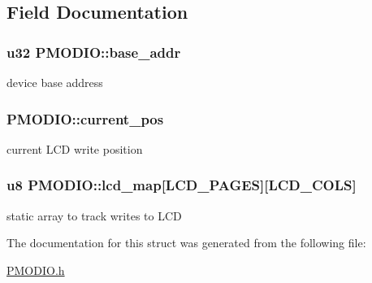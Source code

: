 \subsection{Field Documentation}
\hypertarget{structPMODIO_ad427392097b1a736b78a223b9ba0b646}{
\subsubsection[{base\-\_\-addr}]{\setlength{\rightskip}{0pt plus 5cm}u32 P\-M\-O\-D\-I\-O\-::base\-\_\-addr}}\label{structPMODIO_ad427392097b1a736b78a223b9ba0b646}
device base address \hypertarget{structPMODIO_ab0badb5cd0896ea00f8c2d2c2f51a481}{
\subsubsection[{current\-\_\-pos}]{ P\-M\-O\-D\-I\-O\-::current\-\_\-pos}}\label{structPMODIO_ab0badb5cd0896ea00f8c2d2c2f51a481}
current L\-C\-D write position \hypertarget{structPMODIO_aa8d4b58ef344f6624f70f8b434cd1fa0}{
\subsubsection[{lcd\-\_\-map}]{\setlength{\rightskip}{0pt plus 5cm}u8 P\-M\-O\-D\-I\-O\-::lcd\-\_\-map\mbox{[}{\bf L\-C\-D\-\_\-\-P\-A\-G\-E\-S}\mbox{]}\mbox{[}{\bf L\-C\-D\-\_\-\-C\-O\-L\-S}\mbox{]}}}\label{structPMODIO_aa8d4b58ef344f6624f70f8b434cd1fa0}
static array to track writes to L\-C\-D 

The documentation for this struct was generated from the following file\-:\begin{DoxyCompactItemize}
\item 
\hyperlink{PMODIO_8h}{P\-M\-O\-D\-I\-O.\-h}\end{DoxyCompactItemize}
